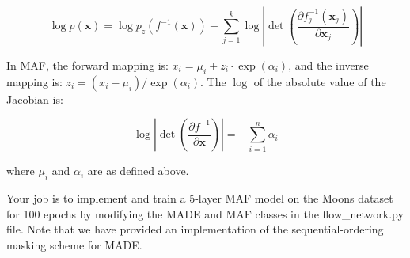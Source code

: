 \documentclass{article}
\theoremstyle{case}
\theoremstyle{definition}
\begin{document}
$$
\log p(\boldsymbol{x})=\log p_{z}\left(f^{-1}(\boldsymbol{x})\right)+\sum_{j=1}^{k} \log \left|\operatorname{det}\left(\frac{\partial f_{j}^{-1}\left(\boldsymbol{x}_{j}\right)}{\partial \boldsymbol{x}_{j}}\right)\right|
$$

In MAF, the forward mapping is: $x_{i}=\mu_{i}+z_{i} \cdot \exp \left(\alpha_{i}\right)$, and the inverse mapping is: $z_{i}=\left(x_{i}-\mu_{i}\right) / \exp \left(\alpha_{i}\right)$. The $\log$ of the absolute value of the Jacobian is:

$$
\log \left|\operatorname{det}\left(\frac{\partial f^{-1}}{\partial \boldsymbol{x}}\right)\right|=-\sum_{i=1}^{n} \alpha_{i}
$$

where $\mu_{i}$ and $\alpha_{i}$ are as defined above.

Your job is to implement and train a 5-layer MAF model on the Moons dataset for 100 epochs by modifying the MADE and MAF classes in the flow\_network.py file. Note that we have provided an implementation of the sequential-ordering masking scheme for MADE.
\end{document}
